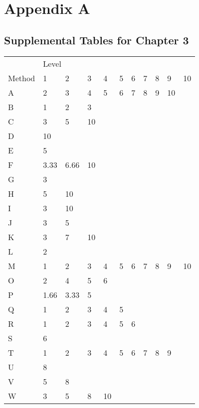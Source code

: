 \appendix
\chapter{Appendix A}
\section{Supplemental Tables for Chapter 3}

\begin{table}[]
	\begin{tabular}{l|llllllllll}
		\hline
		& \multicolumn{10}{l}{Level}                      \\
		\cline{2-11}
		Method & 1    & 2    & 3  & 4  & 5 & 6 & 7 & 8 & 9  & 10 \\
		\hline
		A      & 2    & 3    & 4  & 5  & 6 & 7 & 8 & 9 & 10 &    \\
		B      & 1    & 2    & 3  &    &   &   &   &   &    &    \\
		C      & 3    & 5    & 10 &    &   &   &   &   &    &    \\
		D      & 10   &      &    &    &   &   &   &   &    &    \\
		E      & 5    &      &    &    &   &   &   &   &    &    \\
		F      & 3.33 & 6.66 & 10 &    &   &   &   &   &    &    \\
		G      & 3    &      &    &    &   &   &   &   &    &    \\
		H      & 5    & 10   &    &    &   &   &   &   &    &    \\
		I      & 3    & 10   &    &    &   &   &   &   &    &    \\
		J      & 3    & 5    &    &    &   &   &   &   &    &    \\
		K      & 3    & 7    & 10 &    &   &   &   &   &    &    \\
		L      & 2    &      &    &    &   &   &   &   &    &    \\
		M      & 1    & 2    & 3  & 4  & 5 & 6 & 7 & 8 & 9  & 10 \\
		O      & 2    & 4    & 5  & 6  &   &   &   &   &    &    \\
		P      & 1.66 & 3.33 & 5  &    &   &   &   &   &    &    \\
		Q      & 1    & 2    & 3  & 4  & 5 &   &   &   &    &    \\
		R      & 1    & 2    & 3  & 4  & 5 & 6 &   &   &    &    \\
		S      & 6    &      &    &    &   &   &   &   &    &    \\
		T      & 1    & 2    & 3  & 4  & 5 & 6 & 7 & 8 & 9  &    \\
		U      & 8    &      &    &    &   &   &   &   &    &    \\
		V      & 5    & 8    &    &    &   &   &   &   &    &    \\
		W      & 3    & 5    & 8  & 10 &   &   &   &   &    &   
	\end{tabular}
\end{table}

